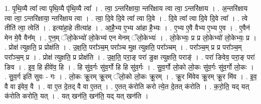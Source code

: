 \documentclass[17pt]{extarticle}
\begin{document}
1. पृ॒थि॒व्यै त्वा᳚ त्वा पृथि॒व्यै पृ॑थि॒व्यै त्वा᳚ । . त्वा॒ ऽन्तरि॑क्षाया॒ न्तरि॑क्षाय त्वा त्वा॒ ऽन्तरि॑क्षाय । . अ॒न्तरि॑क्षाय त्वा त्वा॒ ऽन्तरि॑क्षाया॒ न्तरि॑क्षाय त्वा । . त्वा॒ दि॒वे दि॒वे त्वा᳚ त्वा दि॒वे । . दि॒वे त्वा᳚ त्वा दि॒वे दि॒वे त्वा᳚ । . त्वे तीति॑ त्वा॒ त्वेति॑ । . इत्या॑हा॒हे तीत्या॑ह । . आ॒है॒भ्य ए॒भ्य आ॑हा है॒भ्यः । . ए॒भ्य ए॒वै वैभ्य ए॒भ्य ए॒व । . ए॒वैन॑ मेन मे॒वै वैन᳚म् । . ए॒न॒म् ॅलो॒केभ्यो॑ लो॒केभ्य॑ एन मेनम् ॅलो॒केभ्यः॑ । . लो॒केभ्यः॒ प्र प्र लो॒केभ्यो॑ लो॒केभ्यः॒ प्र । . प्रोक्ष॑ त्युक्षति॒ प्र प्रोक्ष॑ति । . उ॒क्ष॒ति॒ परा᳚ञ्च॒म् परा᳚ञ्च मुक्ष त्युक्षति॒ परा᳚ञ्चम् । . परा᳚ञ्च॒म् प्र प्र परा᳚ञ्च॒म् परा᳚ञ्च॒म् प्र । . प्रोक्ष॑ त्युक्षति॒ प्र प्रोक्ष॑ति । . उ॒क्ष॒ति॒ परा॒ङ् परा॑ ङुक्ष त्युक्षति॒ पराङ्॑ । . परा॑ ङिवेव॒ परा॒ङ् परा॑ ङिव । . इ॒व॒ हि हीवे॑व॒ हि । . हि सु॑व॒र्गः सु॑व॒र्गो हि हि सु॑व॒र्गः । . सु॒व॒र्गो लो॒को लो॒कः सु॑व॒र्गः सु॑व॒र्गो लो॒कः । . सु॒व॒र्ग इति॑ सुवः - गः । . लो॒कः क्रू॒रम् क्रू॒रम् ॅलो॒को लो॒कः क्रू॒रम् । . क्रू॒र मि॑वेव क्रू॒रम् क्रू॒र मि॑व । . इ॒व॒ वै वा इ॑वेव॒ वै । . वा ए॒त दे॒तद् वै वा ए॒तत् । . ए॒तत् क॑रोति करो त्ये॒त दे॒तत् क॑रोति । . क॒रो॒ति॒ यद् यत् क॑रोति करोति॒ यत् । . यत् खन॑ति॒ खन॑ति॒ यद् यत् खन॑ति । \newline
\end{document}

